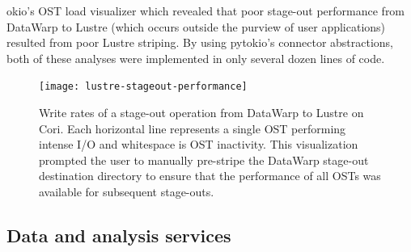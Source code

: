 okio's OST load visualizer which revealed that poor stage-out performance from DataWarp to Lustre (which occurs outside the purview of user applications) resulted from poor Lustre striping.  By using pytokio's connector abstractions, both of these analyses were implemented in only several dozen lines of code.

\begin{figure}[t]
    \centering
    \texttt{[image: lustre-stageout-performance]}
    \vspace{-.3in}
    \caption{Write rates of a stage-out operation from DataWarp to Lustre on Cori.  Each horizontal line represents a single OST performing intense I/O and whitespace is OST inactivity.  This visualization prompted the user to manually pre-stripe the DataWarp stage-out destination directory to ensure that the performance of all OSTs was available for subsequent stage-outs.}
    \label{fig:lustre-heatmap}
    \vspace{-.2in}
\end{figure}

\subsection{Data and analysis services} \label{sec:apps/services}